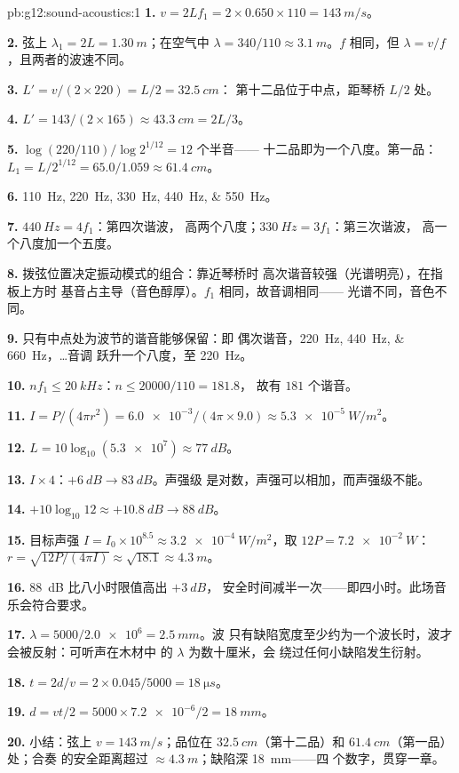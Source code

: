 \begin{solution}{pb:g12:sound-acoustics:1}
\textbf{1.} $v = 2Lf_1 = 2 \times 0.650 \times 110 = \qty{143}{m/s}$。

\textbf{2.} 弦上 $\lambda_1 = 2L = \qty{1.30}{m}$；在空气中
$\lambda = 340/110 \approx \qty{3.1}{m}$。$f$ 相同，但
$\lambda = v/f$，且两者的波速不同。

\textbf{3.} $L' = v/(2 \times 220) = L/2 = \qty{32.5}{cm}$：
第十二品位于中点，距琴桥 $L/2$ 处。

\textbf{4.} $L' = 143/(2 \times 165) \approx \qty{43.3}{cm} = 2L/3$。

\textbf{5.} $\log(220/110)/\log 2^{1/12} = 12$ 个半音——
十二品即为一个八度。第一品：$L_1 = L/2^{1/12} = 65.0/1.059
\approx \qty{61.4}{cm}$。

\textbf{6.} \qtylist{110;220;330;440;550}{Hz}。

\textbf{7.} $\qty{440}{Hz} = 4f_1$：第四次谐波，
高两个八度；$\qty{330}{Hz} = 3f_1$：第三次谐波，
高一个八度加一个五度。

\textbf{8.} 拨弦位置决定振动模式的组合：靠近琴桥时
高次谐音较强（光谱明亮），在指板上方时
基音占主导（音色醇厚）。$f_1$ 相同，故音调相同——
光谱不同，音色不同。

\textbf{9.} 只有中点处为波节的谐音能够保留：即
偶次谐音，\qtylist{220;440;660}{Hz}，\dots 音调
跃升一个八度，至 \qty{220}{Hz}。

\textbf{10.} $nf_1 \le \qty{20}{kHz}$：$n \le 20000/110 = 181.8$，
故有 $181$ 个谐音。

\textbf{11.} $I = P/(4\pi r^2) = \num{6.0e-3}/(4\pi \times 9.0)
\approx \qty{5.3e-5}{W/m^2}$。

\textbf{12.} $L = 10\log_{10}(\num{5.3e7}) \approx \qty{77}{dB}$。

\textbf{13.} $I \times 4$：$+\qty{6}{dB} \to \qty{83}{dB}$。声强级
是对数，声强可以相加，而声强级不能。

\textbf{14.} $+10\log_{10}12 \approx +\qty{10.8}{dB} \to
\qty{88}{dB}$。

\textbf{15.} 目标声强 $I = I_0 \times 10^{8.5} \approx
\qty{3.2e-4}{W/m^2}$，取 $12P = \qty{7.2e-2}{W}$：
$r = \sqrt{12P/(4\pi I)} \approx \sqrt{18.1} \approx \qty{4.3}{m}$。

\textbf{16.} \qty{88}{dB} 比八小时限值高出 $+\qty{3}{dB}$，
安全时间减半一次——即四小时。此场音乐会符合要求。

\textbf{17.} $\lambda = 5000/\num{2.0e6} = \qty{2.5}{mm}$。波
只有缺陷宽度至少约为一个波长时，波才会被反射：可听声在木材中
的 $\lambda$ 为数十厘米，会
绕过任何小缺陷发生衍射。

\textbf{18.} $t = 2d/v = 2 \times 0.045/5000 = \qty{18}{\micro s}$。

\textbf{19.} $d = vt/2 = 5000 \times \num{7.2e-6}/2 = \qty{18}{mm}$。

\textbf{20.} 小结：弦上 $v = \qty{143}{m/s}$；品位在
$\qty{32.5}{cm}$（第十二品）和 $\qty{61.4}{cm}$（第一品）处；合奏
的安全距离超过 $\approx \qty{4.3}{m}$；缺陷深 \qty{18}{mm}——四
个数字，贯穿一章。
\end{solution}
